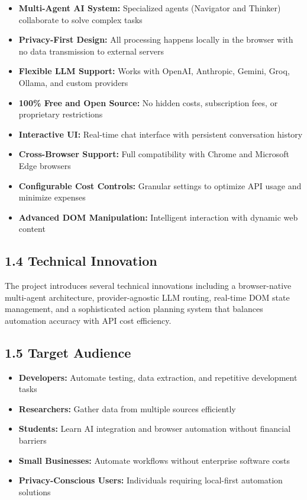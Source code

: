 \documentclass[12pt,a4paper]{article}
\begin{document}
\begin{itemize}
    \item \textbf{Multi-Agent AI System:} Specialized agents (Navigator and Thinker) collaborate to solve complex tasks
    \item \textbf{Privacy-First Design:} All processing happens locally in the browser with no data transmission to external servers
    \item \textbf{Flexible LLM Support:} Works with OpenAI, Anthropic, Gemini, Groq, Ollama, and custom providers
    \item \textbf{100\% Free and Open Source:} No hidden costs, subscription fees, or proprietary restrictions
    \item \textbf{Interactive UI:} Real-time chat interface with persistent conversation history
    \item \textbf{Cross-Browser Support:} Full compatibility with Chrome and Microsoft Edge browsers
    \item \textbf{Configurable Cost Controls:} Granular settings to optimize API usage and minimize expenses
    \item \textbf{Advanced DOM Manipulation:} Intelligent interaction with dynamic web content
\end{itemize}

\vspace{0.3cm}

\subsection*{\textbf{1.4 Technical Innovation}}

The project introduces several technical innovations including a browser-native multi-agent architecture, provider-agnostic LLM routing, real-time DOM state management, and a sophisticated action planning system that balances automation accuracy with API cost efficiency.

\vspace{0.3cm}

\subsection*{\textbf{1.5 Target Audience}}

\begin{itemize}
    \item \textbf{Developers:} Automate testing, data extraction, and repetitive development tasks
    \item \textbf{Researchers:} Gather data from multiple sources efficiently
    \item \textbf{Students:} Learn AI integration and browser automation without financial barriers
    \item \textbf{Small Businesses:} Automate workflows without enterprise software costs
    \item \textbf{Privacy-Conscious Users:} Individuals requiring local-first automation solutions
\end{itemize}
\end{document}

